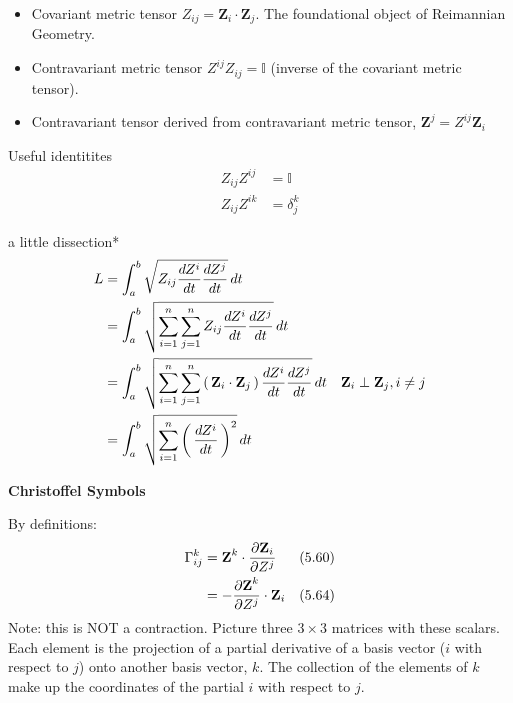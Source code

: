 \documentclass[12pt,a4paper]{report}
\newcommand{\COFF}[3]{\Gamma^{#1}_{{#2}{#3}}}
\newcommand{\VK}[1]{\textbf{#1}}
\begin{document}
\begin{description}
\begin{itemize}
\begin{enumerate}
			\begin{align*}
				\VK{V} &= \sum_{i=1}^n V^i\VK{Z}_i = V^i\VK{Z}_i
			\end{align*}It seems a little silly but this $V^i\VK{Z}_i$ is a new intuitive form of a vector (the index is arbitrary and unique).
			
		\end{enumerate}
		
		\item Covariant metric tensor $Z_{ij} = \VK{Z}_i\cdot\VK{Z}_j$.  The foundational object of Reimannian Geometry.
		\item Contravariant metric tensor $Z^{ij}Z_{ij} = \mathbb{I}$ (inverse of the covariant metric tensor).
		\item Contravariant tensor derived from contravariant metric tensor, $\VK{Z}^j = Z^{ij}\VK{Z}_i$
	\end{itemize}
	
	\item Useful identitites
	\begin{align*}
		Z_{ij}Z^{ij} &= \mathbb{I} \\
		Z_{ij}Z^{ik} &= \delta^k_j
	\end{align*}
	
	\item a little dissection*
	\begin{align*}
		L &= \int^b_a \sqrt{Z_{ij}\frac{dZ^i}{dt}\frac{dZ^j}{dt}}\, dt \\
		&= \int^b_a \sqrt{\sum_{i=1}^n\sum_{j=1}^nZ_{ij}\frac{dZ^i}{dt}\frac{dZ^j}{dt}}\, dt \\
		&= \int^b_a \sqrt{\sum_{i=1}^n\sum_{j=1}^n\PAREN{\VK{Z}_i\cdot\VK{Z}_j}\frac{dZ^i}{dt}\frac{dZ^j}{dt}}\, dt & \VK{Z}_i\perp\VK{Z}_j, i \ne j\\
		&= \int^b_a \sqrt{\sum_{i=1}^n\PAREN{\frac{dZ^i}{dt}}^2}\, dt
	\end{align*}
	\item \textbf{Christoffel Symbols}
	
	By definitions:
	\begin{align*}
		\COFF{k}{i}{j} &= \VK{Z}^k\cdot \PART{\VK{Z}_i}{Z^j} & (5.60)\\
		&= -\PART{\VK{Z}^k}{Z^j}\cdot\VK{Z}_i & (5.64)
	\end{align*}Note: this is NOT a contraction.  Picture three $3\times 3$ matrices with these scalars.  Each element is the projection of a partial derivative  of a basis vector ($i$ with respect to $j$) onto another basis vector, $k$.  The collection of the elements of $k$ make up the coordinates of the partial $i$ with respect to $j$.\\
	

\end{description}
\end{document}
